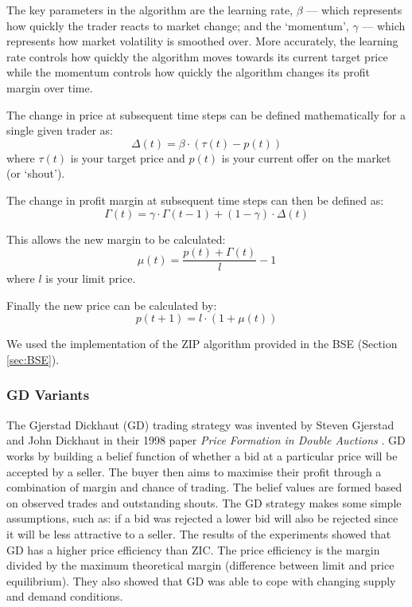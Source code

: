 \documentclass[preprint]{acm_proc_article-sp} %
\begin{document}
The key parameters in the algorithm are the learning rate, $\beta$ --- which represents how quickly the trader reacts to market change; and the `momentum', $\gamma$ --- which represents how market 
volatility is smoothed over. More accurately, the learning rate controls how quickly the algorithm 
moves towards its current target price while the momentum controls how quickly the algorithm changes 
its profit margin over time.

The change in price at subsequent time steps can be defined mathematically for a single given trader as:
\begin{equation}
    \Delta(t) = \beta \cdot ( \tau(t) - p(t))
    \label{eqn:change_in_price}
\end{equation}
where $\tau(t)$ is your target price and $p(t)$ is your current offer on the market (or `shout').

The change in profit margin at subsequent time steps can then be defined as:
\begin{equation}
    \Gamma(t) = \gamma \cdot \Gamma(t-1) + (1 - \gamma) \cdot \Delta(t)
    \label{eqn:change_in_margin}
\end{equation}

This allows the new margin to be calculated:
\begin{equation}
    \mu(t) = \frac{p(t) + \Gamma(t)}{l} - 1
    \label{eqn:new_margin}
\end{equation}
where $l$ is your limit price.

Finally the new price can be calculated by:
\begin{equation}
    p(t+1) = l \cdot (1 + \mu(t))
    \label{eqn:new_price}
\end{equation}

We used the implementation of the ZIP algorithm provided in the BSE (Section \ref{sec:BSE}).\\


\subsubsection{GD Variants} \label{sec:traders_GDV}

The Gjerstad Dickhaut (GD) trading strategy was invented by Steven Gjerstad and John Dickhaut in their 1998 paper \emph{Price Formation in Double
Auctions} \cite{gd}.
GD works by building a belief function of whether a bid at a particular price
will be accepted by a seller.
The buyer then aims to maximise their profit through a combination of margin
and chance of trading.
The belief values are formed based on observed trades and outstanding shouts.
The GD strategy makes some simple assumptions, such as: if a bid was rejected a
lower bid will also be rejected since it will be less attractive to a seller.
The results of the experiments showed that GD has a higher price efficiency than ZIC.
The price efficiency is the margin divided by the maximum theoretical margin
(difference between limit and price equilibrium).
They also showed that GD was able to cope with changing supply and demand
conditions.
\end{document}
